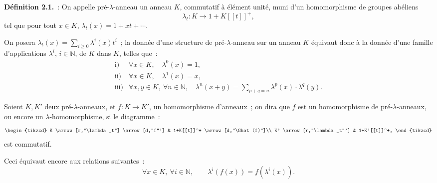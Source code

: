 \textbf{Définition 2.1.}~: On appelle pré-\(\lambda\)-anneau un anneau \(K\), commutatif à élément unité, muni d'un homomorphisme de groupes abéliens
\[
  \lambda_t:K\longrightarrow1+K[[t]]^+,
\]
tel que pour tout \(x\in K\), \(\lambda_t(x)=1+xt+\cdots\).

On posera \(\lambda_t(x)=\sum_{i\geq0}\lambda^i(x)t^i\)~; la donnée d'une structure de pré-\(\lambda\)-anneau sur un anneau \(K\) équivaut donc à la donnée d'une famille d'applications \(\lambda^i\), \(i\in\mathbb N\), de \(K\) dans \(K\), telles que~:
\[
\begin{array}{ll}
\text{i)}& \forall x\in K,\quad \lambda^0(x)=1,\\[0.3em]
\text{ii)}& \forall x\in K,\quad \lambda^1(x)=x,\\[0.3em]
\text{iii)}& \forall x,y\in K,\ \forall n\in\mathbb N,\quad
\lambda^n(x+y)=\displaystyle\sum_{p+q=n}\lambda^p(x)\cdot\lambda^q(y).
\end{array}
\]

Soient \(K,K'\) deux pré-\(\lambda\)-anneaux, et \(f:K\to K'\), un homomorphisme d'anneaux~; on dira que \(f\) est un homomorphisme de pré-\(\lambda\)-anneaux, ou encore un \(\lambda\)-homomorphisme, si le diagramme~:
\[
\begin{tikzcd}
K \arrow[r,"\lambda_t"] \arrow[d,"f"'] &
1+K[[t]]^+ \arrow[d,"\Ghat(f)"]\\
K' \arrow[r,"\lambda_t"'] &
1+K'[[t]]^+,
\end{tikzcd}
\]
est commutatif.

Ceci équivaut encore aux relations suivantes~:
\[
  \forall x\in K,\ \forall i\in\mathbb N,\qquad
  \lambda^i(f(x))=f(\lambda^i(x)).
\]

